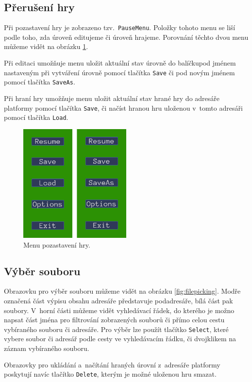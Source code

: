 \subsection{Přerušení hry}
Při pozastavení hry je zobrazeno tzv.~\texttt{PauseMenu}. Položky tohoto menu se liší podle toho, zda úroveň editujeme či úroveň hrajeme. Porovnání těchto dvou menu můžeme vidět na obrázku \ref{fig:pauseMenu}.

Při editaci umožňuje menu uložit aktuální stav úrovně do balíčkupod jménem nastaveným při vytváření úrovně pomocí tlačítka \texttt{Save} či pod novým jménem pomocí tlačítka \texttt{SaveAs}.

Při hraní hry umožňuje menu uložit aktuální stav hrané hry do adresáře platformy pomocí tlačítka \texttt{Save}, či načíst hranou hru uloženou v~tomto adresáři pomocí tlačítka \texttt{Load}.

\begin{figure}[h]
	\centering
	\includegraphics[width=0.5\textwidth]{img/PauseMenuComparison.png}
	\caption{Menu pozastavení hry.}
	\label{fig:pauseMenu}
\end{figure}


\subsection{Výběr souboru}
Obrazovku pro výběr souboru můžeme vidět na obrázku \ref{fig:filepicking}. Modře označená část výpisu obsahu adresáře představuje podadresáře, bílá část pak soubory. V~horní části můžeme vidět vyhledávací řádek, do kterého je možno napsat část jména pro filtrování zobrazených souborů či přímo celou cestu vybíraného souboru či adresáře. Pro výběr lze použít tlačítko \texttt{Select}, které vybere soubor či adresář podle cesty ve vyhledávacím řádku, či dvojklikem na záznam vybíraného souboru.

Obrazovky pro ukládání a~načítání hraných úrovní z~adresáře platformy poskytují navíc tlačítko \texttt{Delete}, kterým je možné uloženou hru smazat.

